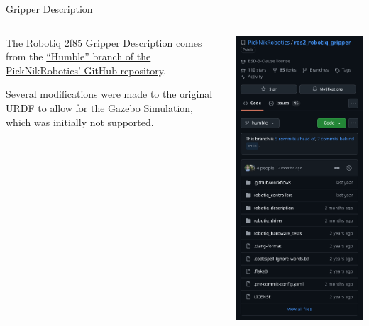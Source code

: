 \begin{frame}{Gripper Description}
    \begin{columns}
        \begin{column}{.75\linewidth}
            The Robotiq 2f85 Gripper Description comes from the \href{https://github.com/PickNikRobotics/ros2_robotiq_gripper/tree/humble}{``Humble'' branch of the PickNikRobotics' GitHub repository}.

            Several modifications were made to the original URDF to allow for the Gazebo Simulation, which was initially not supported.
        \end{column}
        \begin{column}{.25\linewidth}
            \begin{center}
                \includegraphics[width=.75\textwidth]{media/RobotiqGripperDescriptionRepo.png}
            \end{center}
        \end{column}
    \end{columns}
\end{frame}
